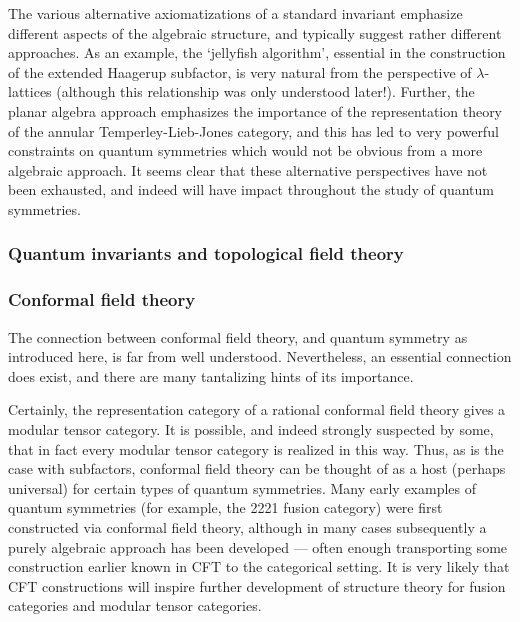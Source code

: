 \documentclass[11pt]{article}
\begin{document}
The various alternative axiomatizations of a standard invariant emphasize different aspects of the algebraic structure, and typically suggest rather different approaches. As an example, the `jellyfish algorithm', essential in the construction of the extended Haagerup subfactor, is very natural from the perspective of $\lambda$-lattices (although this relationship was only understood later!). Further, the planar algebra approach emphasizes the importance of the representation theory of the annular Temperley-Lieb-Jones category, and this has led to very powerful constraints on quantum symmetries which would not be obvious from a more algebraic approach. It seems clear that these alternative perspectives have not been exhausted, and indeed will have impact throughout the study of quantum symmetries.



\subsubsection{Quantum invariants and topological field theory}

\subsubsection{Conformal field theory}

The connection between conformal field theory, and quantum symmetry as introduced here, is far from well understood. Nevertheless, an essential connection does exist, and there are many tantalizing hints of its importance.

Certainly, the representation category of a rational conformal field theory gives a modular tensor category. It is possible, and indeed strongly suspected by some, that in fact every modular tensor category is realized in this way. Thus, as is the case with subfactors, conformal field theory can be thought of as a host (perhaps universal) for certain types of quantum symmetries. Many early examples of quantum symmetries (for example, the 2221 fusion category) were first constructed via conformal field theory, although in many cases subsequently a purely algebraic approach has been developed --- often enough transporting some construction earlier known in CFT to the categorical setting. It is very likely that CFT constructions will inspire further development of structure theory for fusion categories and modular tensor categories.
\end{document}
